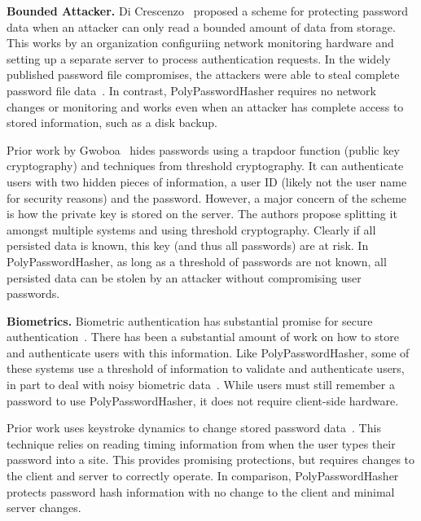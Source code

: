 
{\bf Bounded Attacker.}
Di Crescenzo~\cite{di2006perfectly} proposed a scheme for protecting
password data when an attacker can only read a bounded amount of data from 
storage.   This works by an organization configuriing
network monitoring hardware and setting up a separate server to process 
authentication requests.
In the widely published password file compromises, the 
attackers were able to steal complete password file 
data~\cite{miranteTR13,passwordresearchblog}.   In contrast, 
PolyPasswordHasher requires no network changes or monitoring and works even when an 
attacker has complete access to stored information, such as a disk backup.

Prior work by Gwoboa~\cite{gwoboa1995password} hides passwords using
a trapdoor function (public key cryptography) and techniques from threshold
cryptography.   It can authenticate users with two hidden pieces of 
information, a user ID (likely not the user name for security reasons) and 
the password.   However, a major concern of the scheme is how the private
key is stored on the server.   The authors propose splitting it amongst 
multiple systems and using threshold cryptography.   Clearly if all 
persisted data is known, this key (and thus all passwords) are at risk.
In PolyPasswordHasher, as long as a threshold of passwords are not known, all 
persisted data can be stolen by an attacker without compromising user 
passwords.


{\bf Biometrics.}
Biometric authentication has substantial promise for secure
authentication~\cite{atallah2005secure, snelick2005large, tuyls2004capacity, 
boyen2005secure, erkin2009privacy, kerschbaum2004private, osadchy2010scifi,
monrose2001cryptographic, sae2012biometric}.
There has been a substantial amount of work on how to store and authenticate 
users with this information.   Like PolyPasswordHasher, some of these systems 
use a threshold of information to validate and authenticate users, in part
to deal with noisy biometric data~\cite{juels2006fuzzy, ballard2008practical}.  
While users must still remember a password to use PolyPasswordHasher, it does not 
require client-side hardware.

Prior work uses keystroke dynamics to change stored password 
data~\cite{monrose2000keystroke}.  This technique relies on reading timing 
information from when the user types their password into a site.   This 
provides promising protections, but requires changes to the client and server 
to correctly operate.   In comparison, PolyPasswordHasher protects password
hash information with no change to the client and minimal server changes.

